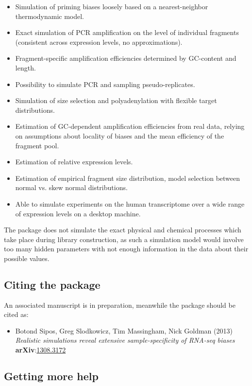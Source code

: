 \begin{itemize}
\item{Simulation of priming biases loosely based on a nearest-neighbor thermodynamic model.}
\item{Exact simulation of PCR amplification on the level of individual fragments (consistent across expression levels, no approximations).}
\item{Fragment-specific amplification efficiencies determined by GC-content and length.}
\item{Possibility to simulate PCR and sampling pseudo-replicates.}
\item{Simulation of size selection and polyadenylation with flexible target distributions.}
\item{Estimation of GC-dependent amplification efficiencies from real data, relying on assumptions about locality of biases and the mean efficiency of the fragment pool.}
\item{Estimation of relative expression levels.}
\item{Estimation of empirical fragment size distribution, model selection between normal vs. skew normal distributions.}
\item{Able to simulate experiments on the human transcriptome over a wide range of expression levels on a desktop machine.}
\end{itemize}

The \rlsim package does not simulate the exact physical and chemical processes which take place during library construction, as such a simulation model would involve too many hidden parameters with not enough information in the data about their possible values. 

\subsection{Citing the package}
\label{ss:citing}

An associated manuscript is in preparation, meanwhile the package should be cited as:

\begin{itemize}
\item[]{
Botond Sipos, Greg Slodkowicz, Tim Massingham, Nick Goldman (2013) \textit{Realistic simulations reveal extensive sample-specificity of RNA-seq biases} \textbf{arXiv}:\href{http://bit.ly/rlsax}{1308.3172}
}

\end{itemize}

\subsection{Getting more help}
\label{ss:more_help}

